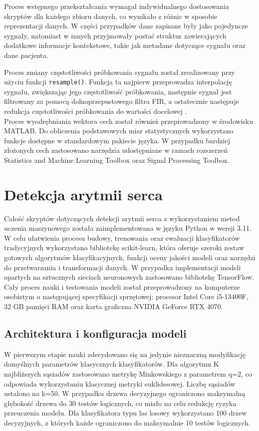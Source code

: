 \documentclass[a4paper,twoside,12pt]{book}
\begin{document}
Proces wstępnego przekształcania wymagał indywidualnego dostosowania skryptów dla każdego zbioru danych, co wynikało z różnic w sposobie reprezentacji danych. W części przypadków dane zapisane były jako pojedyncze sygnały, natomiast w innych przyjmowały postać struktur zawierających dodatkowe informacje kontekstowe, takie jak metadane dotyczące sygnału oraz dane pacjenta.

Proces zmiany częstotliwości próbkowania sygnału został zrealizowany przy użyciu funkcji \texttt{resample()}. Funkcja ta najpierw przeprowadza interpolację sygnału, zwiększając jego częstotliwość próbkowania, następnie sygnał jest filtrowany za pomocą dolnoprzepustowego filtra FIR, a ostatecznie następuje redukcja częstotliwości próbkowania do wartości docelowej \cite{mathworks_resample_2025}.\\


Proces wyodrębniania wektora cech został również przeprowadzony w środowisku MATLAB. Do obliczenia podstawowych miar statystycznych wykorzystano funkcje dostępne w standardowym pakiecie języka. W przypadku bardziej złożonych cech zastosowano narzędzia udostępniane w ramach rozszerzeń Statistics and Machine Learning Toolbox oraz Signal Processing Toolbox.


\chapter{Detekcja arytmii serca}
Całość skryptów dotyczących detekcji arytmii serca z wykorzystaniem metod uczenia maszynowego została zaimplementowana w języku Python w wersji 3.11. W celu ułatwienia procesu budowy, trenowania oraz ewaluacji klasyfikatorów tradycyjnych wykorzystano bibliotekę scikit-learn, która oferuje szeroki zestaw gotowych algorytmów klasyfikacyjnych, funkcji oceny jakości modeli oraz narzędzi do przetwarzania i transformacji danych. W przypadku implementacji modeli opartych na sztucznych sieciach neuronowych zastosowano bibliotekę TensorFlow.\\

Cały proces nauki i testowania modeli został przeprowadzony na komputerze osobistym o następującej specyfikacji sprzętowej: procesor Intel Core i5-13400F, 32 GB pamięci RAM oraz karta graficzna NVIDIA GeForce RTX 4070.
\section{Architektura i konfiguracja modeli}
W pierwszym etapie nauki zdecydowano się na jedynie nieznaczną modyfikację domyślnych parametrów klasycznych klasyfikatorów. Dla algorytmu K najbliższych sąsiadów zastosowano metrykę Minkowskiego z parametrem q=2, co odpowiada wykorzystaniu klasycznej metryki euklidesowej. Liczbę sąsiadów ustalono na k=50. W przypadku drzewa decyzyjnego ograniczono maksymalną głębokość drzewa do 30 testów logicznych, co miało na celu redukcję ryzyka przeuczenia modelu. Dla klasyfikatora typu las losowy wykorzystano 100 drzew decyzyjnych, z których każde ograniczono do maksymalnie 10 testów logicznych.
\end{document}
